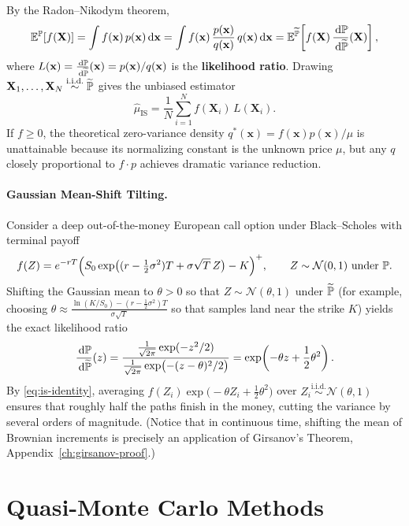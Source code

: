 By the Radon--Nikodym theorem,
\begin{equation}\label{eq:is-identity}
\mathbb{E}^{\mathbb{P}}[f(\mathbf{X})] = \int f(\mathbf{x})\,p(\mathbf{x})\,\mathrm{d}\mathbf{x}
= \int f(\mathbf{x})\,\frac{p(\mathbf{x})}{q(\mathbf{x})}\,q(\mathbf{x})\,\mathrm{d}\mathbf{x}
= \mathbb{E}^{\widetilde{\mathbb{P}}}\!\left[f(\mathbf{X})\,\frac{\,\mathrm{d}\mathbb{P}}{\,\mathrm{d}\widetilde{\mathbb{P}}}(\mathbf{X})\right],
\end{equation}
where $L(\mathbf{x}) = \frac{\,\mathrm{d}\mathbb{P}}{\,\mathrm{d}\widetilde{\mathbb{P}}}(\mathbf{x}) = p(\mathbf{x})/q(\mathbf{x})$ is the \textbf{likelihood ratio}. Drawing $\mathbf{X}_1, \ldots, \mathbf{X}_N \stackrel{\text{i.i.d.}}{\sim} \widetilde{\mathbb{P}}$ gives the unbiased estimator
\[
\widehat{\mu}_{\mathrm{IS}} = \frac{1}{N}\sum_{i=1}^N f(\mathbf{X}_i)\,L(\mathbf{X}_i).
\]
If $f \geq 0$, the theoretical zero-variance density $q^*(\mathbf{x}) = f(\mathbf{x})p(\mathbf{x})/\mu$ is unattainable because its normalizing constant is the unknown price $\mu$, but any $q$ closely proportional to $f \cdot p$ achieves dramatic variance reduction.

\paragraph{Gaussian Mean-Shift Tilting.}
Consider a deep out-of-the-money European call option under Black--Scholes with terminal payoff
\[
f(Z) = e^{-rT}\Bigl(S_0 \exp\bigl((r - \tfrac{1}{2}\sigma^2)T + \sigma\sqrt{T}\,Z\bigr) - K\Bigr)^+, \qquad Z \sim \mathcal{N}(0, 1) \text{ under } \mathbb{P}.
\]
Shifting the Gaussian mean to $\theta > 0$ so that $Z \sim \mathcal{N}(\theta, 1)$ under $\widetilde{\mathbb{P}}$ (for example, choosing $\theta \approx \frac{\ln(K/S_0) - (r - \frac{1}{2}\sigma^2)T}{\sigma\sqrt{T}}$ so that samples land near the strike $K$) yields the exact likelihood ratio
\[
\frac{\,\mathrm{d}\mathbb{P}}{\,\mathrm{d}\widetilde{\mathbb{P}}}(z) = \frac{\frac{1}{\sqrt{2\pi}}\exp(-z^2/2)}{\frac{1}{\sqrt{2\pi}}\exp\bigl(-(z - \theta)^2/2\bigr)} = \exp\!\left(-\theta z + \frac{1}{2}\theta^2\right).
\]
By \eqref{eq:is-identity}, averaging $f(Z_i)\exp\bigl(-\theta Z_i + \frac{1}{2}\theta^2\bigr)$ over $Z_i \stackrel{\text{i.i.d.}}{\sim} \mathcal{N}(\theta, 1)$ ensures that roughly half the paths finish in the money, cutting the variance by several orders of magnitude. (Notice that in continuous time, shifting the mean of Brownian increments is precisely an application of Girsanov's Theorem, Appendix~\ref{ch:girsanov-proof}.)

\section{Quasi-Monte Carlo Methods}

